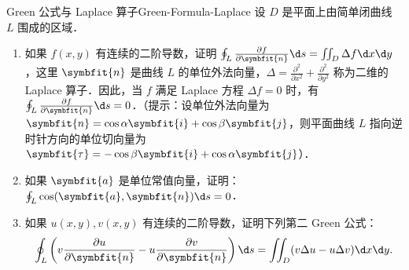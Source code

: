 \begin{problem}{Green 公式与 Laplace 算子}{Green-Formula-Laplace}
    设 $D$ 是平面上由简单闭曲线 $L$ 围成的区域．
    \begin{enumerate}
        \item 如果 $f(x,y)$ 有连续的二阶导数，证明 $\oint_{L} \frac{\partial f}{\partial \symbfit{n}} \d s = \iint_{D} \Delta f \d x \d y$，这里 $\symbfit{n}$ 是曲线 $L$ 的单位外法向量，$\Delta = \frac{\partial^2}{\partial x^2} + \frac{\partial^2}{\partial y^2}$ 称为二维的 Laplace 算子．因此，当 $f$ 满足 Laplace 方程 $\Delta f = 0$ 时，有 $\oint_{L} \frac{\partial f}{\partial \symbfit{n}} \d s = 0$．（提示：设单位外法向量为 $\symbfit{n} = \cos \alpha \symbfit{i} + \cos \beta \symbfit{j}$，则平面曲线 $L$ 指向逆时针方向的单位切向量为 $\symbfit{\tau} = -\cos \beta \symbfit{i} + \cos \alpha \symbfit{j}$）．
        \item 如果 $\symbfit{a}$ 是单位常值向量，证明：$\oint_{L} \cos(\symbfit{a}, \symbfit{n}) \d s = 0$．
        \item 如果 $u(x,y), v(x,y)$ 有连续的二阶导数，证明下列第二 Green 公式：
              \begin{equation}
                  \oint_{L} \left( v \frac{\partial u}{\partial \symbfit{n}} - u \frac{\partial v}{\partial \symbfit{n}} \right) \d s = \iint_{D} (v \Delta u - u \Delta v) \d x \d y.
              \end{equation}
    \end{enumerate}
\end{problem}

